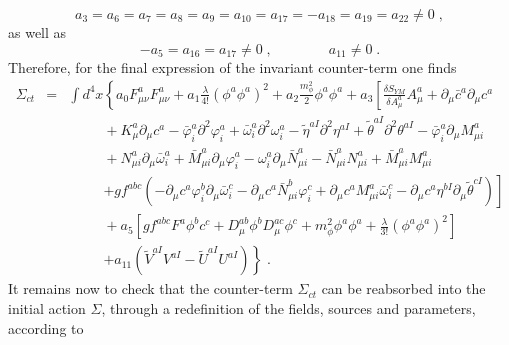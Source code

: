 \begin{appendix}
\begin{equation}
a_{3} = a_{6} = a_{7} = a_{8} = a_{9} = a_{10} = a_{17} = -a_{18} = a_{19} = a_{22} \neq 0   \;, \label{p1}
\end{equation}
as well as 
\begin{equation}
-a_{5} = a_{16} = a_{17}\neq 0 \;,  \qquad  \qquad a_{11}\neq 0 \;.   \label{p2}   
\end{equation}
Therefore, for the final expression of the invariant  counter-term one finds
\begin{eqnarray}
\label{fullct}
\Sigma_{ct} &=& \int d^{4}x \left\{ a_{0} F^{a}_{\mu\nu}F^{a}_{\mu\nu}
+ a_{1}\frac{\lambda}{4!}(\phi^{a}\phi^{a})^{2}
+ a_{2}\frac{m_{\phi}^{2}}{2}\phi^{a}\phi^{a}
+ a_{3}\left[ \frac{\delta S_{YM}}{\delta A^{a}_{\mu}}A^{a}_{\mu} 
+ \partial_{\mu}\bar{c}^{a}\partial_{\mu}c^{a}
\right.
\right.
\nonumber \\
&&
\phantom{\int d^{4}x}
+ K^{a}_{\mu}\partial_{\mu}c^{a}
-\bar{\varphi}^{a}_{i}\partial^{2}\varphi^{a}_{i}
+ \bar{\omega}^{a}_{i}\partial^{2}\omega^{a}_{i}
-\tilde{\eta}^{aI}\partial^{2}\eta^{aI}
+ \tilde{\theta}^{aI}\partial^{2}\theta^{aI}
- \bar{\varphi}^{a}_{i}\partial_{\mu}M^{a}_{\mu i}
\nonumber \\
&&
\phantom{\int d^{4}x}
+ N^{a}_{\mu i}\partial_{\mu}\bar{\omega}^{a}_{i}
+ \bar{M}^{a}_{\mu i}\partial_{\mu}\varphi^{a}_{i}
- \omega^{a}_{i}\partial_{\mu}\bar{N}^{a}_{\mu i}
- \bar{N}^{a}_{\mu i}N^{a}_{\mu i}
+ \bar{M}^{a}_{\mu i}M^{a}_{\mu i}
\nonumber \\
&&
\phantom{\int d^{4}x}
\left.
+ gf^{abc}\left(
- \partial_{\mu}c^{a}\varphi^{b}_{i}\partial_{\mu}\bar{\omega}^{c}_{i}
- \partial_{\mu}c^{a}\bar{N}^{b}_{\mu i}\varphi^{c}_{i}
+ \partial_{\mu}c^{a}M^{a}_{\mu i}\bar{\omega}^{c}_{i}
- \partial_{\mu}c^{a}\eta^{bI}\partial_{\mu}\tilde{\theta}^{cI}
\right)
\right]
\nonumber \\
&&
\phantom{\int d^{4}x}
+ a_{5}\left[gf^{abc}F^{a}\phi^{b}c^{c}
+ D^{ab}_{\mu}\phi^{b}D^{ac}_{\mu}\phi^{c}
+ m_{\phi}^{2}\phi^{a}\phi^{a}
+ \frac{\lambda}{3!}(\phi^{a}\phi^{a})^{2}
\right]
\nonumber \\
&&
\phantom{\int d^{4}x}
\left.
+ a_{11}\left(\tilde{V}^{aI}V^{aI} - \tilde{U}^{aI}U^{aI}\right)
\right\}\;.
\end{eqnarray}
It remains now to check that the counter-term $\Sigma_{ct}$ can be reabsorbed into the initial action $\Sigma$, through a redefinition of the fields, sources and parameters, according to 
\begin{equation}
\label{renorm}

\end{equation}
\end{appendix}

